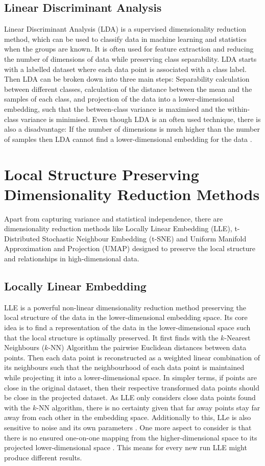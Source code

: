 \documentclass[pdftex,12pt,a4paper]{report}
\begin{document}
\subsection{Linear Discriminant Analysis}
Linear Discriminant Analysis (LDA) is a supervised dimensionality reduction method, which can be used to classify data in machine learning and statistics when the groups are known.
It is often used for feature extraction and reducing the number of dimensions of data while preserving class separability.
LDA starts with a labelled dataset where each data point is associated with a class label.
Then LDA can be broken down into three main steps: Separability calculation between different classes, calculation of the distance between the mean and the samples of each class, and projection of the data into a lower-dimensional embedding, such that the between-class variance is maximised and the within-class variance is minimised.
Even though LDA is an often used technique, there is also a disadvantage:
If the number of dimensions is much higher than the number of samples then LDA cannot find a lower-dimensional embedding for the data \cite{lda} \cite{linear-dim-red}.

\section{Local Structure Preserving Dimensionality Reduction Methods}

Apart from capturing variance and statistical independence, there are dimensionality reduction methods like Locally Linear Embedding (LLE), t-Distributed Stochastic Neighbour Embedding (t-SNE) and Uniform Manifold Approximation and Projection (UMAP) designed to preserve the local structure and relationships in high-dimensional data.

\subsection{Locally Linear Embedding}
LLE is a powerful non-linear dimensionality reduction method preserving the local structure of the data in the lower-dimensional embedding space.
Its core idea is to find a representation of the data in the lower-dimensional space such that the local structure is optimally preserved.
It first finds with the $k$-Nearest Neighbours ($k$-NN) Algorithm the pairwise Euclidean distances between data points.
Then each data point is reconstructed as a weighted linear combination of its neighbours such that the neighbourhood of each data point is maintained while projecting it into a lower-dimensional space.
In simpler terms, if points are close in the original dataset, then their respective transformed data points should be close in the projected dataset.
As LLE only considers close data points found with the $k$-NN algorithm, there is no certainty given that far away points stay far away from each other in the embedding space.
Additionally to this, LLe is also sensitive to noise and its own parameters \cite{LLE}.
One more aspect to consider is that there is no ensured one-on-one mapping from the higher-dimensional space to its projected lower-dimensional space \cite{drawback-LLE}.
This means for every new run LLE might produce different results.
\end{document}
